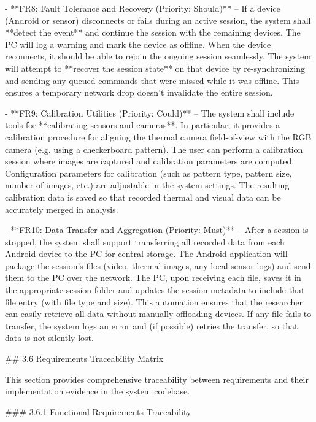 \documentclass[12pt,a4paper]{article}
\begin{document}
- **FR8: Fault Tolerance and Recovery (Priority: Should)** -- If a device (Android or sensor) disconnects or fails during an active session, the system shall **detect the event** and continue the session with the remaining devices. The PC will log a warning and mark the device as offline. When the device reconnects, it should be able to rejoin the ongoing session seamlessly. The system will attempt to **recover the session state** on that device by re-synchronizing and sending any queued commands that were missed while it was offline. This ensures a temporary network drop doesn't invalidate the entire session.

- **FR9: Calibration Utilities (Priority: Could)** -- The system shall include tools for **calibrating sensors and cameras**. In particular, it provides a calibration procedure for aligning the thermal camera field-of-view with the RGB camera (e.g. using a checkerboard pattern). The user can perform a calibration session where images are captured and calibration parameters are computed. Configuration parameters for calibration (such as pattern type, pattern size, number of images, etc.) are adjustable in the system settings. The resulting calibration data is saved so that recorded thermal and visual data can be accurately merged in analysis.

- **FR10: Data Transfer and Aggregation (Priority: Must)** -- After a session is stopped, the system shall support transferring all recorded data from each Android device to the PC for central storage. The Android application will package the session's files (video, thermal images, any local sensor logs) and send them to the PC over the network. The PC, upon receiving each file, saves it in the appropriate session folder and updates the session metadata to include that file entry (with file type and size). This automation ensures that the researcher can easily retrieve all data without manually offloading devices. If any file fails to transfer, the system logs an error and (if possible) retries the transfer, so that data is not silently lost.

## 3.6 Requirements Traceability Matrix

This section provides comprehensive traceability between requirements and their implementation evidence in the system codebase.

### 3.6.1 Functional Requirements Traceability
\end{document}
